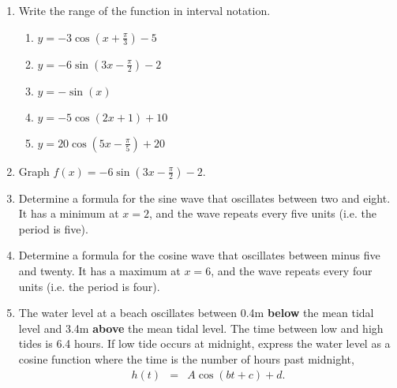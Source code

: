 \begin{enumerate}
\item Write the range of the function in interval notation.
\begin{enumerate}
\item $y=-3\cos\left(x+\frac{\pi}{3}\right)-5$
\item $y=-6\sin\left(3x-\frac{\pi}{2}\right)-2$
\item $y=-\sin(x)$
\item $y=-5\cos(2x+1)+ 10$
\item $y=20\cos\left(5x-\frac{\pi}{5}\right)+20$
\end{enumerate}

\item Graph $f(x)=-6\sin\left(3x-\frac{\pi}{2}\right)-2$.


\item Determine a formula for the sine wave that oscillates between
  two and eight. It has a minimum at $x = 2$, and the wave repeats
  every five units (i.e. the period is five).

\item Determine a formula for the cosine wave that oscillates between
  minus five and twenty. It has a maximum at $x=6$, and the wave repeats
  every four units (i.e. the period is four).

\item The water level at a beach oscillates between 0.4m
  \textbf{below} the mean tidal level and 3.4m \textbf{above} the mean
  tidal level. The time between low and high tides is 6.4 hours. If
  low tide occurs at midnight, express the water level as a cosine
  function where the time is the number of hours past midnight,
  \begin{eqnarray*}
    h(t) & = & A \cos(bt+c)+d.
  \end{eqnarray*}


\end{enumerate}
